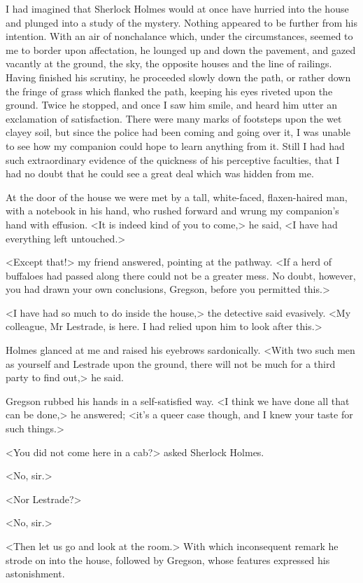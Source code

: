 I had imagined that Sherlock Holmes would at once have hurried into the house and plunged into a study of the mystery. Nothing appeared to be further from his intention. With an air of nonchalance which, under the circumstances, seemed to me to border upon affectation, he lounged up and down the pavement, and gazed vacantly at the ground, the sky, the opposite houses and the line of railings. Having finished his scrutiny, he proceeded slowly down the path, or rather down the fringe of grass which flanked the path, keeping his eyes riveted upon the ground. Twice he stopped, and once I saw him smile, and heard him utter an exclamation of satisfaction. There were many marks of footsteps upon the wet clayey soil, but since the police had been coming and going over it, I was unable to see how my companion could hope to learn anything from it. Still I had had such extraordinary evidence of the quickness of his perceptive faculties, that I had no doubt that he could see a great deal which was hidden from me.

At the door of the house we were met by a tall, white-faced, flaxen-haired man, with a notebook in his hand, who rushed forward and wrung my companion's hand with effusion. <It is indeed kind of you to come,> he said, <I have had everything left untouched.>

<Except that!> my friend answered, pointing at the pathway. <If a herd of buffaloes had passed along there could not be a greater mess. No doubt, however, you had drawn your own conclusions, Gregson, before you permitted this.>

<I have had so much to do inside the house,> the detective said evasively. <My colleague, Mr Lestrade, is here. I had relied upon him to look after this.>

Holmes glanced at me and raised his eyebrows sardonically. <With two such men as yourself and Lestrade upon the ground, there will not be much for a third party to find out,> he said.

Gregson rubbed his hands in a self-satisfied way. <I think we have done all that can be done,> he answered; <it's a queer case though, and I knew your taste for such things.>

<You did not come here in a cab?> asked Sherlock Holmes.

<No, sir.>

<Nor Lestrade?>

<No, sir.>

<Then let us go and look at the room.> With which inconsequent remark he strode on into the house, followed by Gregson, whose features expressed his astonishment.

